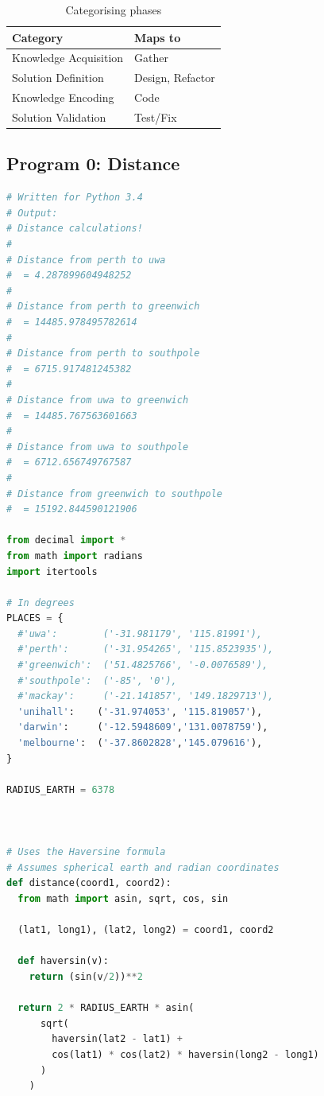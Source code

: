\documentclass[a4paper,10pt]{article}
\begin{document}
\begin{appendices}
  \begin{table}[htb!]
   \centering
   \begin{tabular}{|l|l|}
    \hline
    Category & Maps to \\ \hline
    Knowledge Acquisition & Gather \\
    Solution Definition & Design, Refactor \\
    Knowledge Encoding & Code \\
    Solution Validation & Test/Fix \\ \hline
   \end{tabular}
    \caption{Categorising phases}
    \label{tab:rawtimingstocats}
  \end{table}
  
  \subsection{Program 0: Distance}
  \begin{lstlisting}[language=Python]
# Written for Python 3.4
# Output:
# Distance calculations!
#
# Distance from perth to uwa
#  = 4.287899604948252
#
# Distance from perth to greenwich
#  = 14485.978495782614
#
# Distance from perth to southpole
#  = 6715.917481245382
#
# Distance from uwa to greenwich
#  = 14485.767563601663
#
# Distance from uwa to southpole
#  = 6712.656749767587
#
# Distance from greenwich to southpole
#  = 15192.844590121906

from decimal import *
from math import radians
import itertools

# In degrees
PLACES = {
  #'uwa':        ('-31.981179', '115.81991'),
  #'perth':      ('-31.954265', '115.8523935'),
  #'greenwich':  ('51.4825766', '-0.0076589'),
  #'southpole':  ('-85', '0'),
  #'mackay':     ('-21.141857', '149.1829713'),
  'unihall':    ('-31.974053', '115.819057'),
  'darwin':     ('-12.5948609','131.0078759'),
  'melbourne':  ('-37.8602828','145.079616'),
}

RADIUS_EARTH = 6378



# Uses the Haversine formula
# Assumes spherical earth and radian coordinates
def distance(coord1, coord2):
  from math import asin, sqrt, cos, sin

  (lat1, long1), (lat2, long2) = coord1, coord2

  def haversin(v):
    return (sin(v/2))**2

  return 2 * RADIUS_EARTH * asin(
      sqrt(
        haversin(lat2 - lat1) + 
        cos(lat1) * cos(lat2) * haversin(long2 - long1)
      )
    )




\end{lstlisting}
\end{appendices}
\end{document}
